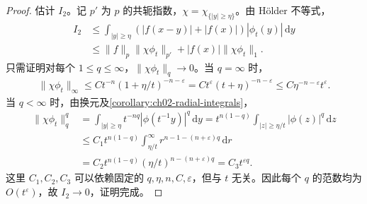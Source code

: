 \documentclass[../../main.tex]{subfiles}
\begin{document}
\begin{proof}
估计 $I_2$。记 $p'$ 为 $p$ 的共轭指数，$\chi=\chi_{\{|y|\geqslant\eta\}}$。由 Hölder 不等式，
\begin{align*}
I_2&\leqslant\int_{|y|\geqslant\eta}(|f(x-y)|+|f(x)|)|\phi_t(y)|\,\mathrm dy\\
&\leqslant\|f\|_p\|\chi\phi_t\|_{p'}+|f(x)|\|\chi\phi_t\|_1.
\end{align*}
只需证明对每个 $1\leqslant q\leqslant\infty$，$\|\chi\phi_t\|_q\to0$。当 $q=\infty$ 时，
\begin{align*}
\|\chi\phi_t\|_\infty
\leqslant Ct^{-n}(1+\eta/t)^{-n-\varepsilon}
=Ct^\varepsilon(t+\eta)^{-n-\varepsilon}
\leqslant C\eta^{-n-\varepsilon}t^\varepsilon.
\end{align*}
当 $q<\infty$ 时，由换元及\cref{corollary:ch02-radial-integrals}，
\begin{align*}
\|\chi\phi_t\|_q^q
&=\int_{|y|\geqslant\eta}t^{-nq}|\phi(t^{-1}y)|^q\,\mathrm dy
=t^{n(1-q)}\int_{|z|\geqslant\eta/t}|\phi(z)|^q\,\mathrm dz\\
&\leqslant C_1t^{n(1-q)}\int_{\eta/t}^\infty r^{n-1-(n+\varepsilon)q}\,\mathrm dr\\
&=C_2t^{n(1-q)}(\eta/t)^{n-(n+\varepsilon)q}
=C_3t^{\varepsilon q}.
\end{align*}
这里 $C_1,C_2,C_3$ 可以依赖固定的 $q,\eta,n,C,\varepsilon$，但与 $t$ 无关。因此每个 $q$ 的范数均为 $O(t^\varepsilon)$，故 $I_2\to0$，证明完成。
\end{proof}
\end{document}
